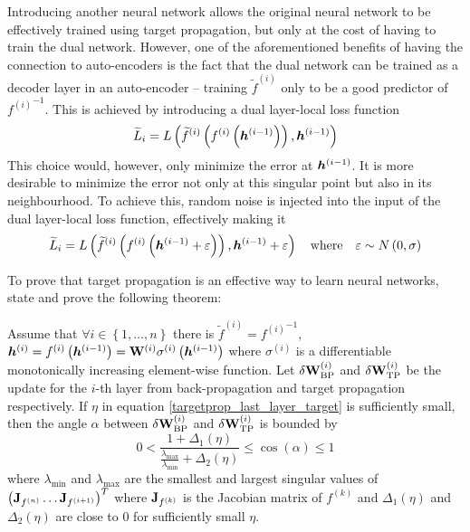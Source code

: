 Introducing another neural network allows the original neural network to be effectively trained using target propagation, but only at the cost of having to train the dual network. However, one of the aforementioned benefits of having the connection to auto-encoders is the fact that the dual network can be trained as a decoder layer in an auto-encoder -- training \( \widetilde{f}^{(i)} \) only to be a good predictor of \( {f^{(i)}}^{-1} \). This is achieved by introducing a dual layer-local loss function
\[ \widetilde{L}_i = L \left( \widetilde{f}^{(i)} \left( f^{(i)} \left( \bm{h}^{(i - 1)} \right) \right), \bm{h}^{(i - 1)} \right) \]
This choice would, however, only minimize the error at \( \bm{h}^{(i - 1)} \). It is more desirable to minimize the error not only at this singular point but also in its neighbourhood. To achieve this, random noise is injected into the input of the dual layer-local loss function, effectively making it
\[ \widetilde{L}_i = L \left( \widetilde{f}^{(i)} \left( f^{(i)} \left( \bm{h}^{(i - 1)} + \varepsilon \right) \right), \bm{h}^{(i - 1)} + \varepsilon \right) \quad \text{where} \quad \varepsilon \sim N \left( 0, \sigma \right) \]

To prove that target propagation is an effective way to learn neural networks, \cite{lee_difference_2015} state and prove the following theorem:

\begin{theorem}
	Assume that \( \forall i \in \left\{ 1, \dots, n \right\} \) there is \( \widetilde{f}^{(i)} = {f^{(i)}}^{-1} \), \( \bm{h}^{(i)} = f^{(i)} \left( \bm{h}^{(i - 1)} \right) = \mathbf{W}^{(i)} \sigma^{(i)} \left( \bm{h}^{(i - 1)} \right) \) where \( \sigma^{(i)} \) is a differentiable monotonically increasing element-wise function. Let \( \delta \mathbf{W}^{(i)}_{\mathrm{BP}} \) and \( \delta \mathbf{W}^{(i)}_{\mathrm{TP}} \) be the update for the \( i \)-th layer from back-propagation and target propagation respectively. If \( \eta \) in equation \ref{targetprop_last_layer_target} is sufficiently small, then the angle \( \alpha \) between \( \delta \mathbf{W}^{(i)}_{\mathrm{BP}} \) and \( \delta \mathbf{W}^{(i)}_{\mathrm{TP}} \) is bounded by
	\[ 0 < \frac{1 + \Delta_1 \left( \eta \right)}{\frac{\lambda_{\mathrm{max}}}{\lambda_{\mathrm{min}}} + \Delta_2 \left( \eta \right)} \leq \cos \left( \alpha \right) \leq 1 \]
		where \( \lambda_{\mathrm{min}} \) and \( \lambda_{\mathrm{max}} \) are the smallest and largest singular values of \( \left( \mathbf{J}_{f^{(n)}} \dots \mathbf{J}_{f^{(i + 1)}} \right)^T \) where \( \mathbf{J}_{f^{(k)}} \) is the Jacobian matrix of \( f^{(k)} \) and \( \Delta_1 \left( \eta \right) \) and \( \Delta_2 \left( \eta \right) \) are close to \( 0 \) for sufficiently small \( \eta \).
\end{theorem}

